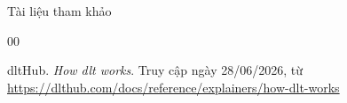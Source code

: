 \begin{frame}{Tài liệu tham khảo}
\begin{thebibliography}{00}



dltHub. \textit{How dlt works}. Truy cập ngày 28/06/2026, từ \url{https://dlthub.com/docs/reference/explainers/how-dlt-works}

\end{thebibliography}

\end{frame}
